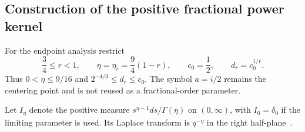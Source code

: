 \documentclass[11pt,a4paper]{article}
\numberwithin{equation}{section}
\theoremstyle{definition}\newtheorem{definition}[theorem]{Definition}
\theoremstyle{remark}\newtheorem{remark}[theorem]{Remark}
\begin{document}
\subsection{Construction of the positive fractional power kernel}\label{d:sec:positive-kernel}

For the endpoint analysis restrict
\begin{equation}\label{d:eq:kernel-parameters}
 \frac34\le r<1,\qquad
 \eta=\eta_r=\frac94(1-r),\qquad
 c_0=\frac12,\qquad d_r=c_0^{1/r}.
\end{equation}
Thus $0<\eta\le9/16$ and $2^{-4/3}\le d_r\le c_0$. The symbol $a=i/2$ remains the centering point and is not reused as a fractional-order parameter.

Let $I_\eta$ denote the positive measure
$s^{\eta-1}ds/\Gamma(\eta)$ on $(0,\infty)$, with $I_0=\delta_0$ if the limiting parameter is used. Its Laplace transform is $q^{-\eta}$ in the right half-plane~\cite[Eq.~5.9.1]{DLMF}.
\end{document}

